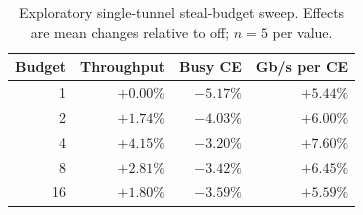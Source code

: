 \begin{table}[t]
  \caption{Exploratory single-tunnel steal-budget sweep. Effects are mean
  changes relative to off; $n=5$ per value.}
  \label{tab:steal-sweep}
  \small
  \begin{tabular}{@{}rrrr@{}}
    \toprule
    Budget & Throughput & Busy CE & Gb/s per CE \\
    \midrule
     1 & $+0.00\%$ & $-5.17\%$ & $+5.44\%$ \\
     2 & $+1.74\%$ & $-4.03\%$ & $+6.00\%$ \\
     4 & $\mathbf{+4.15\%}$ & $-3.20\%$ & $\mathbf{+7.60\%}$ \\
     8 & $+2.81\%$ & $-3.42\%$ & $+6.45\%$ \\
    16 & $+1.80\%$ & $-3.59\%$ & $+5.59\%$ \\
    \bottomrule
  \end{tabular}
\end{table}
